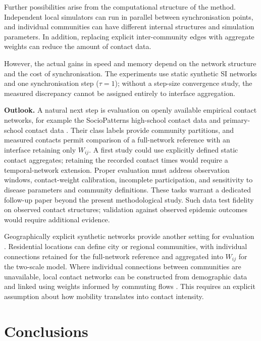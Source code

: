 \documentclass{ieeeaccess}
\newcommand{\michael}[2]{{\color{RoyalBlue}#1}}
\begin{document}
Further possibilities arise from the computational structure of the method. Independent local simulators can run in parallel between synchronisation points, and individual communities can have different internal structures and simulation parameters. In addition, replacing explicit inter-community edges with aggregate weights can reduce the amount of contact data. \michael{However, the actual gains in speed and memory depend on the network structure and the cost of synchronisation. The experiments use static synthetic SI networks and one synchronisation step ($\tau=1$); without a step-size convergence study, the measured discrepancy cannot be assigned entirely to interface aggregation.

\textbf{Outlook.} A natural next step is evaluation on openly available empirical contact networks, for example the SocioPatterns high-school contact data \cite{mastrandrea2015} and primary-school contact data \cite{stehle2011,gemmetto2014}. Their class labels provide community partitions, and measured contacts permit comparison of a full-network reference with an interface retaining only $W_{ij}$. A first study could use explicitly defined static contact aggregates; retaining the recorded contact times would require a temporal-network extension. Proper evaluation must address observation windows, contact-weight calibration, incomplete participation, and sensitivity to disease parameters and community definitions. These tasks warrant a dedicated follow-up paper beyond the present methodological study. Such data test fidelity on observed contact structures; validation against observed epidemic outcomes would require additional evidence.}{However, the actual gains in speed and memory depend on the network structure and the cost of synchronisation.}

Geographically explicit synthetic networks provide another setting for evaluation \cite{jiang2024synthetic}. Residential locations can define city or regional communities, with individual connections retained for the full-network reference and aggregated into $W_{ij}$ for the two-scale model. Where individual connections between communities are unavailable, local contact networks can be constructed from demographic data and linked using weights informed by commuting flows \cite{tulchinsky2024networks,tizzoni2014mobility}. This requires an explicit assumption about how mobility translates into contact intensity.

\section{Conclusions}
\label{sec:conclusions}
\end{document}
